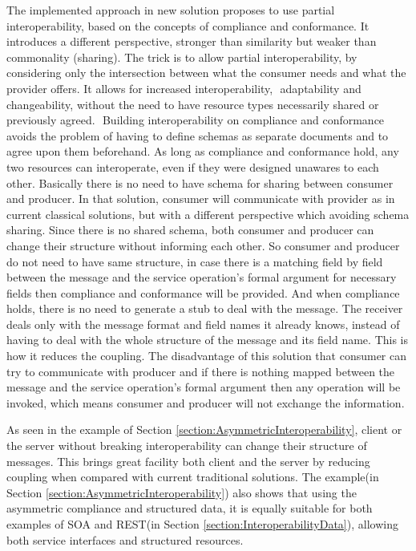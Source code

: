 The implemented approach in new solution proposes to use partial interoperability, based on the concepts of compliance and conformance. It introduces a different perspective, stronger than similarity but weaker than commonality (sharing). The trick is to allow partial interoperability, by considering only the intersection between what the consumer needs and what the provider offers. It allows for increased interoperability,  adaptability and changeability, without the need to have resource types necessarily shared or previously agreed.  Building interoperability on compliance and conformance avoids the problem of having to define schemas as separate documents and to agree upon them beforehand. As long as compliance and conformance hold, any two resources can interoperate, even if they were designed unawares to each other. Basically there is no need to have schema for sharing between consumer and producer. In that solution, consumer will communicate with provider as in current classical solutions, but with a different perspective which avoiding schema sharing. Since there is no shared schema, both consumer and producer can change their structure without informing each other. So consumer and producer do not need to have same structure, in case there is a matching field by field between the message and the service operation’s formal argument for necessary fields then compliance and conformance will be provided. And when compliance holds, there is no need to generate a stub to deal with the message. The receiver deals only with the message format and field names it already knows, instead of having to deal with the whole structure of the message and its field name. This is how it reduces the coupling. The disadvantage of this solution that consumer can try to communicate with producer and if there is nothing mapped between the message and the service operation’s formal argument then any operation will be invoked, which means consumer and producer will not exchange the information.

As seen in the example of Section \ref{section:AsymmetricInteroperability}, client or the server without breaking interoperability can change their structure of messages. This brings great facility both client and the server by reducing coupling when compared with current traditional solutions. The example(in Section \ref{section:AsymmetricInteroperability}) also shows that using the asymmetric compliance and structured data, it is equally suitable for both examples of SOA and REST(in Section \ref{section:InteroperabilityData}), allowing both service interfaces and structured resources. 

